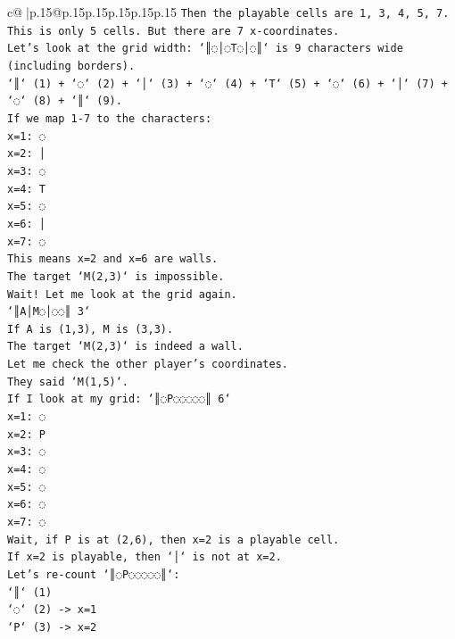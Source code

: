 \documentclass{article}
\begin{document}
{\begin{supertabular}{c@{$\;$}|p{.15\linewidth}@{}p{.15\linewidth}p{.15\linewidth}p{.15\linewidth}p{.15\linewidth}p{.15\linewidth}}
{{{\texttt{Then the playable cells are 1, 3, 4, 5, 7.} \\
\texttt{This is only 5 cells. But there are 7 x{-}coordinates.} \\
\texttt{Let's look at the grid width: `║◌│◌T◌│◌║` is 9 characters wide (including borders).} \\
\texttt{`║` (1) + `◌` (2) + `│` (3) + `◌` (4) + `T` (5) + `◌` (6) + `│` (7) + `◌` (8) + `║` (9).} \\
\texttt{If we map 1{-}7 to the characters:} \\
\texttt{x=1: ◌} \\
\texttt{x=2: │} \\
\texttt{x=3: ◌} \\
\texttt{x=4: T} \\
\texttt{x=5: ◌} \\
\texttt{x=6: │} \\
\texttt{x=7: ◌} \\
\texttt{This means x=2 and x=6 are walls.} \\
\texttt{The target `M(2,3)` is impossible.} \\
\texttt{Wait! Let me look at the grid again.} \\
\texttt{`║A│M◌│◌◌║ 3`} \\
\texttt{If A is (1,3), M is (3,3).} \\
\texttt{The target `M(2,3)` is indeed a wall.} \\
\texttt{Let me check the other player's coordinates.} \\
\texttt{They said `M(1,5)`.} \\
\texttt{If I look at my grid: `║◌P◌◌◌◌◌║ 6`} \\
\texttt{x=1: ◌} \\
\texttt{x=2: P} \\
\texttt{x=3: ◌} \\
\texttt{x=4: ◌} \\
\texttt{x=5: ◌} \\
\texttt{x=6: ◌} \\
\texttt{x=7: ◌} \\
\texttt{Wait, if P is at (2,6), then x=2 is a playable cell.} \\
\texttt{If x=2 is playable, then `│` is not at x=2.} \\
\texttt{Let's re{-}count `║◌P◌◌◌◌◌║`:} \\
\texttt{`║` (1)} \\
\texttt{`◌` (2) {-}> x=1} \\
\texttt{`P` (3) {-}> x=2} \\
}}}
\end{supertabular}}
\end{document}
